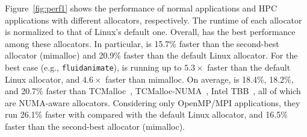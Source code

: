 Figure~\ref{fig:perf1} shows the performance of normal applications and HPC applications with different allocators, respectively. The runtime of each allocator is normalized to that of Linux's default one. 
Overall, \NM{} has the best performance among these allocators. In particular, \NM{} is 15.7\% faster than the second-best allocator (mimalloc) and 20.9\% faster than the default Linux allocator. 
For the best case (e.g., \texttt{fluidanimate}), \NM{} is running up to $5.3\times$ faster than the default Linux allocator, and $4.6\times$ faster than mimalloc.
On average, \NM{} is 18.4\%, 18.2\%, and 20.7\% faster than TCMalloc~\cite{tcmalloc2}, TCMalloc-NUMA~\cite{tcmallocnuma}, Intel TBB~\cite{tbb3}, all of which are NUMA-aware allocators. Considering only OpenMP/MPI applications, they run 26.1\% faster with \NM{} compared with the default Linux allocator, and 16.5\% faster than the second-best allocator (mimalloc).


